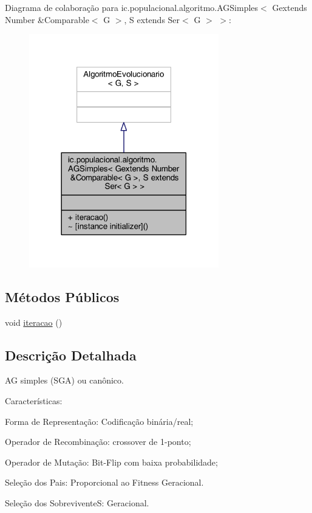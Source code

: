 Diagrama de colaboração para ic.\-populacional.\-algoritmo.\-A\-G\-Simples$<$ Gextends Number \&Comparable$<$ G $>$, S extends Ser$<$ G $>$ $>$\-:\nopagebreak
\begin{figure}[H]
\begin{center}
\leavevmode
\includegraphics[width=234pt]{classic_1_1populacional_1_1algoritmo_1_1_a_g_simples_3_01_gextends_01_number_01_6_comparable_3_05ec3f2f1b04b7b3ba232b6087e927d58}
\end{center}
\end{figure}
\subsection*{Métodos Públicos}
\begin{DoxyCompactItemize}
\item 
void \hyperlink{classic_1_1populacional_1_1algoritmo_1_1_a_g_simples_3_01_gextends_01_number_01_6_comparable_3_0be0ec9d5f7dd5a82100acb38215a761d_af517e2be0edc10b8db274cd8a7cb59be}{iteracao} ()
\end{DoxyCompactItemize}


\subsection{Descrição Detalhada}
A\-G simples (S\-G\-A) ou canônico. 

Características\-: 
\begin{DoxyItemize}
\item Forma de Representação\-: Codificação binária/real; 
\item Operador de Recombinação\-: crossover de 1-\/ponto; 
\item Operador de Mutação\-: Bit-\/\-Flip com baixa probabilidade; 
\item Seleção dos Pais\-: Proporcional ao Fitness Geracional. 
\item Seleção dos Sobrevivente\-S\-: Geracional. 
\end{DoxyItemize}


